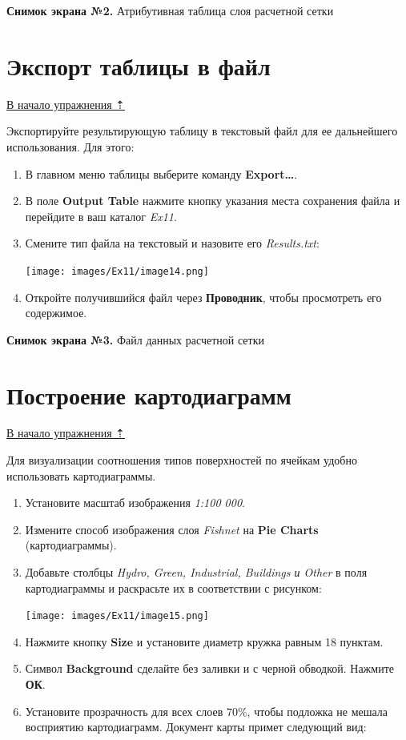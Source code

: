 \documentclass[12pt,]{book}
\begin{document}
\textbf{Снимок экрана №2.} Атрибутивная таблица слоя расчетной сетки

\hypertarget{land-cover-hydro-export}{%
\section{Экспорт таблицы в файл}\label{land-cover-hydro-export}}

\protect\hyperlink{land-cover-hydro}{В начало упражнения ⇡}

Экспортируйте результирующую таблицу в текстовый файл для ее дальнейшего использования. Для этого:

\begin{enumerate}
\def\labelenumi{\arabic{enumi}.}
\item
  В главном меню таблицы выберите команду \textbf{Export\ldots{}}.
\item
  В поле \textbf{Output Table} нажмите кнопку указания места сохранения файла и перейдите в ваш каталог \emph{Ex11}.
\item
  Смените тип файла на текстовый и назовите его \emph{Results.txt}:

  \texttt{[image: images/Ex11/image14.png]}
\item
  Откройте получившийся файл через \textbf{Проводник}, чтобы просмотреть его содержимое.
\end{enumerate}

\textbf{Снимок экрана №3.} Файл данных расчетной сетки

\hypertarget{land-cover-hydro-diagrams}{%
\section{Построение картодиаграмм}\label{land-cover-hydro-diagrams}}

\protect\hyperlink{land-cover-hydro}{В начало упражнения ⇡}

Для визуализации соотношения типов поверхностей по ячейкам удобно использовать картодиаграммы.

\begin{enumerate}
\def\labelenumi{\arabic{enumi}.}
\item
  Установите масштаб изображения \emph{1:100 000}.
\item
  Измените способ изображения слоя \emph{Fishnet} на \textbf{Pie Charts} (картодиаграммы).
\item
  Добавьте столбцы \emph{Hydro, Green, Industrial, Buildings и Other} в поля картодиаграммы и раскрасьте их в соответствии с рисунком:

  \texttt{[image: images/Ex11/image15.png]}
\item
  Нажмите кнопку \textbf{Size} и установите диаметр кружка равным 18 пунктам.
\item
  Символ \textbf{Background} сделайте без заливки и с черной обводкой. Нажмите \textbf{ОК}.
\item
  Установите прозрачность для всех слоев 70\%, чтобы подложка не мешала восприятию картодиаграмм. Документ карты примет следующий вид:
\end{enumerate}
\end{document}
